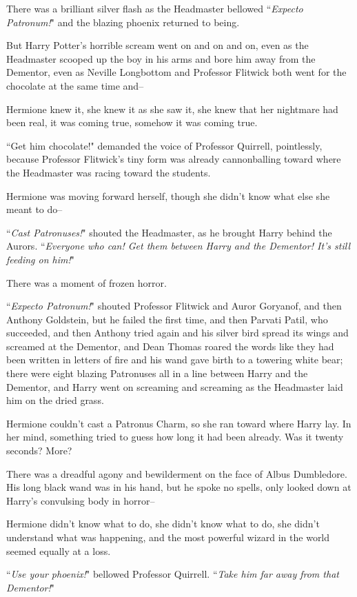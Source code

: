 There was a brilliant silver flash as the Headmaster bellowed ``\emph{Expecto Patronum!}" and the blazing phoenix returned to being.

But Harry Potter's horrible scream went on and on and on, even as the Headmaster scooped up the boy in his arms and bore him away from the Dementor, even as Neville Longbottom and Professor Flitwick both went for the chocolate at the same time and\---

Hermione knew it, she knew it as she saw it, she knew that her nightmare had been real, it was coming true, somehow it was coming true.

``Get him chocolate!" demanded the voice of Professor Quirrell, pointlessly, because Professor Flitwick's tiny form was already cannonballing toward where the Headmaster was racing toward the students.

Hermione was moving forward herself, though she didn't know what else she meant to do\---

``\emph{Cast Patronuses!}" shouted the Headmaster, as he brought Harry behind the Aurors. ``\emph{Everyone who can! Get them between Harry and the Dementor! It's still feeding on him!}"

There was a moment of frozen horror.

``\emph{Expecto Patronum!}" shouted Professor Flitwick and Auror Goryanof, and then Anthony Goldstein, but he failed the first time, and then Parvati Patil, who succeeded, and then Anthony tried again and his silver bird spread its wings and screamed at the Dementor, and Dean Thomas roared the words like they had been written in letters of fire and his wand gave birth to a towering white bear; there were eight blazing Patronuses all in a line between Harry and the Dementor, and Harry went on screaming and screaming as the Headmaster laid him on the dried grass.

Hermione couldn't cast a Patronus Charm, so she ran toward where Harry lay. In her mind, something tried to guess how long it had been already. Was it twenty seconds? More?

There was a dreadful agony and bewilderment on the face of Albus Dumbledore. His long black wand was in his hand, but he spoke no spells, only looked down at Harry's convulsing body in horror\---

Hermione didn't know what to do, she didn't know what to do, she didn't understand what was happening, and the most powerful wizard in the world seemed equally at a loss.

``\emph{Use your phoenix!}" bellowed Professor Quirrell. ``\emph{Take him far away from that Dementor!}"

